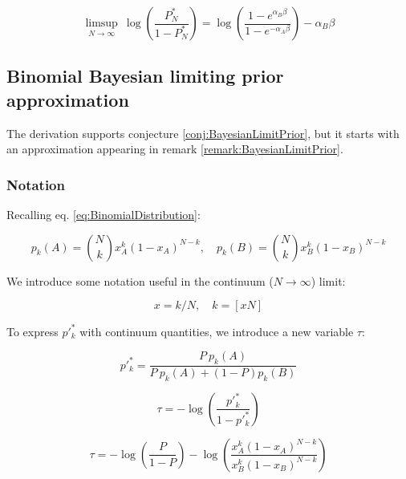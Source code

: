 \documentclass{article}
\theoremstyle{definition}
\begin{document}
\begin{equation}
    \label{deriv:limsupPN}
    \limsup_{N \to \infty} 
    \ \log \left ( \frac{P^*_N}{1-P^*_N} \right )
    =
    \log \left ( \frac{1-e^{\alpha_B \beta}}
    {1-e^{-\alpha_A \beta}} \right ) 
    -\alpha_B \beta 
\end{equation}

\subsection{Binomial Bayesian limiting prior approximation}
\label{sec:BinomialBayesianLimitingApproximation}

The derivation supports conjecture \ref{conj:BayesianLimitPrior}, but it starts with an approximation appearing in remark \ref{remark:BayesianLimitPrior}.

\subsubsection{Notation}

Recalling eq. \eqref{eq:BinomialDistribution}:

\begin{equation}
    \label{eq:Appendix_BinomialDistribution}
    p_k(A) = \binom{N}{k} x_A^k (1-x_A)^{N-k}, \quad
    p_k(B) = \binom{N}{k} x_B^k (1-x_B)^{N-k}
\end{equation}

We introduce some notation useful in the continuum ($N \to \infty$) limit:

\begin{equation}
    x = k/N, \quad k = [x N]
\end{equation}

To express $p'^*_k$ with continuum quantities, we introduce a new variable $\tau$:

\begin{equation}
    p'^*_k=\frac{P \ p_k(A)}{P \ p_k(A) + (1-P) p_k(B)}
\end{equation}

\begin{equation}
    \tau = - \log \left ( \frac{p'^*_k}{1-p'^*_k} \right ) 
\end{equation}

\begin{equation}
    \tau = - \log \left ( \frac{P}{1-P} \right ) -  
    \log \left ( \frac{x_A^k (1-x_A)^{N-k}}{x_B^k (1-x_B)^{N-k}} \right )
\end{equation}
\end{document}
